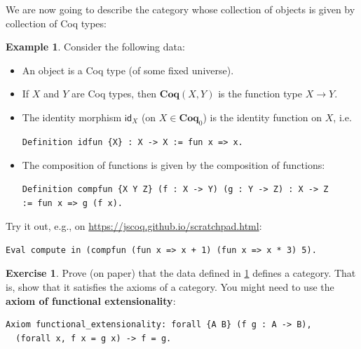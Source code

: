 \documentclass[a4paper,11pt, oneside,titlepage=false]{scrbook}
\theoremstyle{plain}
\theoremstyle{definition}
\newtheorem{exa}[thm]{Example}
\newtheorem{exer}[thm]{Exercise}
\newcommand{\cfont}[1]{\ensuremath{\mathsf{#1}}}
\newcommand{\Catb}[1]{\mathbf{#1}}
\newcommand{\COQ}{\Catb{Coq}}
\newcommand{\Ob}[1]{{#1}_0}
\newcommand{\CHom}[3]{{#1}(#2,#3)}
\newcommand{\Id}[1][]{\cfont{id}_{#1}}
\begin{document}
We are now going to describe the category whose collection of objects is given by collection of Coq types:
\begin{exa}\label{exa:coq-cat}
  Consider the following data:
\begin{itemize}
\item An object is a Coq type (of some fixed universe).
\item If $X$ and $Y$ are Coq types, then $\CHom \COQ X Y$ is the function type $X\to Y$.
\item The identity morphism $\Id[X]$ (on $X\in \Ob{\COQ}$) is the identity function on $X$, i.e.
\begin{lstlisting}
Definition idfun {X} : X -> X := fun x => x.
\end{lstlisting}
\item The composition of functions is given by the composition of functions:
\begin{lstlisting}
Definition compfun {X Y Z} (f : X -> Y) (g : Y -> Z) : X -> Z
:= fun x => g (f x).
\end{lstlisting}
\end{itemize}
  Try it out, e.g., on \url{https://jscoq.github.io/scratchpad.html}:
\begin{lstlisting}
Eval compute in (compfun (fun x => x + 1) (fun x => x * 3) 5).
\end{lstlisting}
\end{exa}

\begin{exer}
  Prove (on paper) that the data defined in \cref{exa:coq-cat} defines a category.
  That is, show that it satisfies the axioms of a category.
  You might need to use the \textbf{axiom of functional extensionality}:
\begin{lstlisting}
Axiom functional_extensionality: forall {A B} (f g : A -> B),
  (forall x, f x = g x) -> f = g.
\end{lstlisting}
\end{exer}
\end{document}

